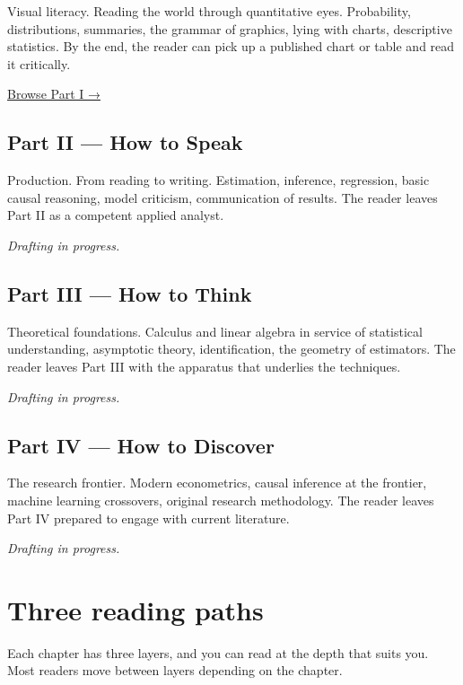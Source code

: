 \documentclass[
  letterpaper,
  11pt,
  twoside,
  openany]{scrbook}
\begin{document}
Visual literacy. Reading the world through quantitative eyes.
Probability, distributions, summaries, the grammar of graphics, lying
with charts, descriptive statistics. By the end, the reader can pick up
a published chart or table and read it critically.

\href{prose/part1/01-numbers-on-the-page.qmd}{Browse Part I →}

\subsection{Part II --- How to Speak}\label{part-ii-how-to-speak}

Production. From reading to writing. Estimation, inference, regression,
basic causal reasoning, model criticism, communication of results. The
reader leaves Part II as a competent applied analyst.

\emph{Drafting in progress.}

\subsection{Part III --- How to Think}\label{part-iii-how-to-think}

Theoretical foundations. Calculus and linear algebra in service of
statistical understanding, asymptotic theory, identification, the
geometry of estimators. The reader leaves Part III with the apparatus
that underlies the techniques.

\emph{Drafting in progress.}

\subsection{Part IV --- How to Discover}\label{part-iv-how-to-discover}

The research frontier. Modern econometrics, causal inference at the
frontier, machine learning crossovers, original research methodology.
The reader leaves Part IV prepared to engage with current literature.

\emph{Drafting in progress.}

\section{Three reading paths}\label{three-reading-paths}

Each chapter has three layers, and you can read at the depth that suits
you. Most readers move between layers depending on the chapter.
\end{document}
